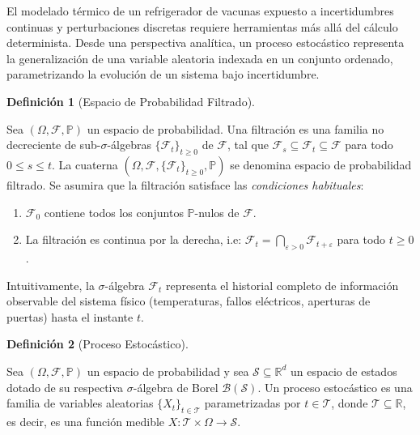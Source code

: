 \documentclass[
  spanish,
  letterpaper,
  DIV=11,
  numbers=noendperiod]{scrreprt}
\providecommand{\tightlist}{%
  \setlength{\itemsep}{0pt}\setlength{\parskip}{0pt}}
\theoremstyle{plain}
\theoremstyle{plain}
\theoremstyle{plain}
\theoremstyle{definition}
\newtheorem{definition}{Definición}[chapter]
\theoremstyle{remark}
\begin{document}
El modelado térmico de un refrigerador de vacunas expuesto a
incertidumbres continuas y perturbaciones discretas requiere
herramientas más allá del cálculo determinista. Desde una perspectiva
analítica, un proceso estocástico representa la generalización de una
variable aleatoria indexada en un conjunto ordenado, parametrizando la
evolución de un sistema bajo incertidumbre.

\begin{definition}[Espacio de Probabilidad
Filtrado]\protect\hypertarget{def-espacio-filtrado}{}\label{def-espacio-filtrado}

Sea \((\Omega, \mathcal{F}, \mathbb{P})\) un espacio de probabilidad.
Una filtración es una familia no decreciente de sub-\(\sigma\)-álgebras
\(\{\mathcal{F}_t\}_{t \ge 0}\) de \(\mathcal{F}\), tal que
\(\mathcal{F}_s \subseteq \mathcal{F}_t \subseteq \mathcal{F}\) para
todo \(0 \le s \le t\). La cuaterna
\((\Omega, \mathcal{F}, \{\mathcal{F}_t\}_{t \ge 0}, \mathbb{P})\) se
denomina espacio de probabilidad filtrado. Se asumira que la filtración
satisface las \emph{condiciones habituales}:

\begin{enumerate}
\def\labelenumi{\arabic{enumi}.}
\tightlist
\item
  \(\mathcal{F}_0\) contiene todos los conjuntos \(\mathbb{P}\)-nulos de
  \(\mathcal{F}\).
\item
  La filtración es continua por la derecha, i.e:
  \(\displaystyle \mathcal{F}_t = \bigcap_{\varepsilon > 0} \mathcal{F}_{t+\varepsilon}\)
  para todo \(t \ge 0\).
\end{enumerate}

\end{definition}

Intuitivamente, la \(\sigma\)-álgebra \(\mathcal{F}_t\) representa el
historial completo de información observable del sistema físico
(temperaturas, fallos eléctricos, aperturas de puertas) hasta el
instante \(t\).

\begin{definition}[Proceso
Estocástico]\protect\hypertarget{def-proceso-estocastico}{}\label{def-proceso-estocastico}

Sea \((\Omega, \mathcal{F}, \mathbb{P})\) un espacio de probabilidad y
sea \(\mathcal{S} \subseteq \mathbb{R}^d\) un espacio de estados dotado
de su respectiva \(\sigma\)-álgebra de Borel
\(\mathcal{B}(\mathcal{S})\). Un proceso estocástico es una familia de
variables aleatorias \(\{X_t\}_{t \in \mathcal{T}}\) parametrizadas por
\(t \in \mathcal{T}\), donde \(\mathcal{T} \subseteq \mathbb{R}\), es
decir, es una función medible
\(X: \mathcal{T} \times \Omega \to \mathcal{S}\).

\end{definition}
\end{document}

